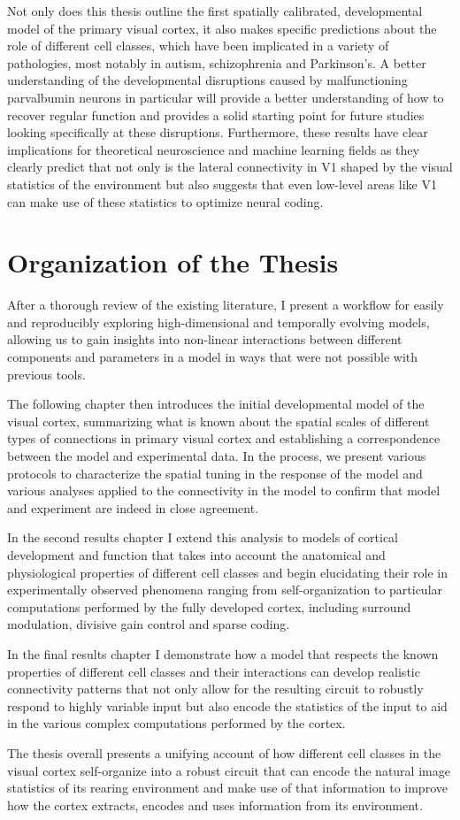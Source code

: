 Not only does this thesis outline the first spatially calibrated,
developmental model of the primary visual cortex, it also makes specific
predictions about the role of different cell classes, which have been
implicated in a variety of pathologies, most notably in autism,
schizophrenia and Parkinson's. A better understanding of the
developmental disruptions caused by malfunctioning parvalbumin neurons
in particular will provide a better understanding of how to recover
regular function and provides a solid starting point for future
studies looking specifically at these disruptions. Furthermore, these
results have clear implications for theoretical neuroscience and
machine learning fields as they clearly predict that not only is the
lateral connectivity in V1 shaped by the visual statistics of the
environment but also suggests that even low-level areas like V1 can
make use of these statistics to optimize neural coding.

\section{Organization of the Thesis}

After a thorough review of the existing literature, I present a
workflow for easily and reproducibly exploring high-dimensional and
temporally evolving models, allowing us to gain insights into
non-linear interactions between different components and parameters in
a model in ways that were not possible with previous tools.

The following chapter then introduces the initial developmental model
of the visual cortex, summarizing what is known about the spatial scales
of different types of connections in primary visual cortex and
establishing a correspondence between the model and experimental data. In
the process, we present various protocols to characterize the spatial
tuning in the response of the model and various analyses applied to
the connectivity in the model to confirm that model and experiment are
indeed in close agreement.

In the second results chapter I extend this analysis to models of
cortical development and function that takes into account the
anatomical and physiological properties of different cell classes and
begin elucidating their role in experimentally observed phenomena
ranging from self-organization to particular computations performed by
the fully developed cortex, including surround modulation, divisive
gain control and sparse coding.

In the final results chapter I demonstrate how a model that respects
the known properties of different cell classes and their interactions
can develop realistic connectivity patterns that not only allow for
the resulting circuit to robustly respond to highly variable input but
also encode the statistics of the input to aid in the various complex
computations performed by the cortex.

The thesis overall presents a unifying account of
how different cell classes in the visual cortex self-organize into a
robust circuit that can encode the natural image statistics of its
rearing environment and make use of that information to improve how
the cortex extracts, encodes and uses information from its
environment.
